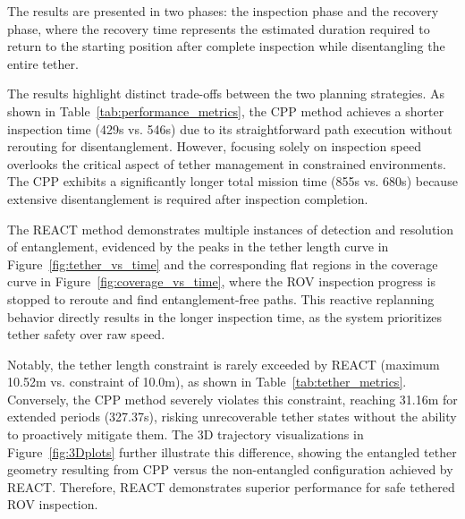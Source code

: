 The results are presented in two phases: the inspection phase and the recovery phase, where the recovery time represents the estimated duration required to return to the starting position after complete inspection while disentangling the entire tether.

The results highlight distinct trade-offs between the two planning strategies. As shown in Table~\ref{tab:performance_metrics}, the \ac{CPP} method achieves a shorter inspection time (429s vs. 546s) due to its straightforward path execution without rerouting for disentanglement. However, focusing solely on inspection speed overlooks the critical aspect of tether management in constrained environments. The \ac{CPP} exhibits a significantly longer total mission time (855s vs. 680s) because extensive disentanglement is required after inspection completion.

The \ac{REACT} method demonstrates multiple instances of detection and resolution of entanglement, evidenced by the peaks in the tether length curve in Figure~\ref{fig:tether_vs_time} and the corresponding flat regions in the coverage curve in Figure~\ref{fig:coverage_vs_time}, where the \ac{ROV} inspection progress is stopped to reroute and find entanglement-free paths. This reactive replanning behavior directly results in the longer inspection time, as the system prioritizes tether safety over raw speed.

Notably, the tether length constraint is rarely exceeded by \ac{REACT} (maximum 10.52m vs. constraint of 10.0m), as shown in Table~\ref{tab:tether_metrics}. Conversely, the \ac{CPP} method severely violates this constraint, reaching 31.16m for extended periods (327.37s), risking unrecoverable tether states without the ability to proactively mitigate them. The 3D trajectory visualizations in Figure~\ref{fig:3Dplots} further illustrate this difference, showing the entangled tether geometry resulting from \ac{CPP} versus the non-entangled configuration achieved by \ac{REACT}. Therefore, \ac{REACT} demonstrates superior performance for safe tethered \ac{ROV} inspection.

